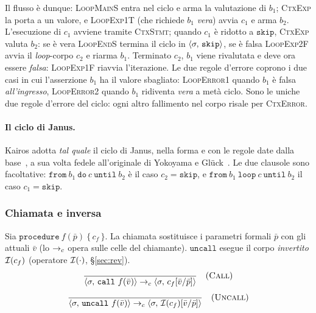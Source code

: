 \noindent
Il flusso è dunque: \textsc{LoopMainS} entra nel ciclo e arma la valutazione
di $b_1$; \textsc{CtxExp} la porta a un valore, e \textsc{LoopExp1T} (che
richiede $b_1$ \emph{vera}) avvia $c_1$ e arma $b_2$. L'esecuzione di $c_1$
avviene tramite \textsc{CtxStmt}; quando $c_1$ è ridotto a $\mathtt{skip}$,
\textsc{CtxExp} valuta $b_2$: se è vera \textsc{LoopEndS} termina il ciclo in
$\langle \sigma,\, \mathtt{skip} \rangle$, se è falsa \textsc{LoopExp2F} avvia il
\emph{loop}-corpo $c_2$ e riarma $b_1$. Terminato $c_2$, $b_1$ viene
rivalutata e deve ora essere \emph{falsa}: \textsc{LoopExp1F} riavvia
l'iterazione. Le due regole d'errore coprono i due casi in cui l'asserzione
$b_1$ ha il valore sbagliato: \textcolor{red!60!black}{\textsc{LoopError1}}
quando $b_1$ è falsa \emph{all'ingresso}, \textcolor{red!60!black}{\textsc{LoopError2}}
quando $b_1$ ridiventa \emph{vera} a metà ciclo. Sono le uniche due regole
d'errore del ciclo: ogni altro fallimento nel corpo risale per
\textcolor{red!60!black}{\textsc{CtxError}}.

\paragraph{Il ciclo di Janus.} Kairos adotta \emph{tal quale} il ciclo di
Janus, nella forma e con le regole date dalla base~\cite{LamiLaneseStefani2024},
a sua volta fedele all'originale di Yokoyama e Glück~\cite{YokoyamaGluck2007}.
Le due clausole sono facoltative: $\mathtt{from}\ b_1\ \mathtt{do}\ c\
\mathtt{until}\ b_2$ è il caso $c_2 = \mathtt{skip}$, e
$\mathtt{from}\ b_1\ \mathtt{loop}\ c\ \mathtt{until}\ b_2$ il caso
$c_1 = \mathtt{skip}$.

\subsubsection{Chiamata e inversa}
\label{sec:call}
Sia $\mathtt{procedure}\ f(\bar p)\ \{\, c_f \,\}$. La chiamata sostituisce i
parametri formali $\bar p$ con gli attuali $\bar v$ (lo $\to_c$ opera sulle celle
del chiamante). $\mathtt{uncall}$ esegue il corpo \emph{invertito}
$\mathcal{I}(c_f)$ (operatore $\mathcal{I}(\cdot)$, \S\ref{sec:rev}).
\[
\dfrac{}{\langle \sigma,\, \mathtt{call}\ f(\bar v) \rangle \to_c \langle \sigma,\, c_f[\bar v/\bar p] \rangle} \quad(\textsc{Call})
\]
\[
\dfrac{}{\langle \sigma,\, \mathtt{uncall}\ f(\bar v) \rangle \to_c \langle \sigma,\, \mathcal{I}(c_f)[\bar v/\bar p] \rangle} \quad(\textsc{Uncall})
\]

